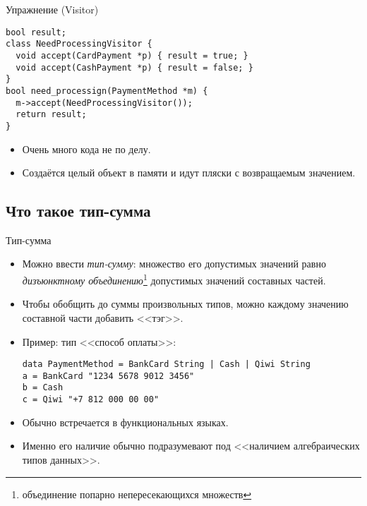 \begin{frame}[fragile]{Упражнение (Visitor)}
\begin{verbatim}
bool result;
class NeedProcessingVisitor {
  void accept(CardPayment *p) { result = true; }
  void accept(CashPayment *p) { result = false; }
}
bool need_processign(PaymentMethod *m) {
  m->accept(NeedProcessingVisitor());
  return result;
}
\end{verbatim}
	\begin{itemize}
		\item Очень много кода не по делу.
		\item Создаётся целый объект в памяти и идут пляски с возвращаемым значением.
	\end{itemize}
\end{frame}

\subsection{Что такое тип-сумма}
\begin{frame}[fragile]{Тип-сумма}
	\begin{itemize}
		\item Можно ввести \textit{тип-сумму}: множество его допустимых значений равно \textit{дизъюнктному объединению}\footnote{объединение попарно непересекающихся множеств} допустимых значений составных частей.
		\item Чтобы обобщить до суммы произвольных типов, можно каждому значению составной части добавить <<тэг>>.
		\item Пример: тип <<способ оплаты>>:
\begin{verbatim}
data PaymentMethod = BankCard String | Cash | Qiwi String
a = BankCard "1234 5678 9012 3456"
b = Cash
c = Qiwi "+7 812 000 00 00"
\end{verbatim}
		\item Обычно встречается в функциональных языках.
		\item Именно его наличие обычно подразумевают под <<наличием алгебраических типов данных>>.
	\end{itemize}
\end{frame}

